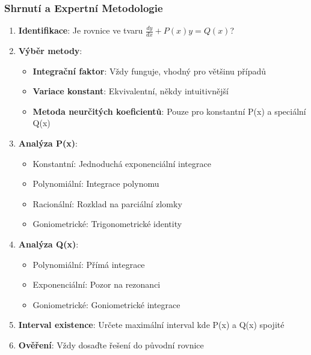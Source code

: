 \vspace{0.8\baselineskip}

\subsubsection{Shrnutí a Expertní Metodologie}
\label{subsubsec:shrnuti-metodologie}

\begin{method}
\label{met:decision-tree-linearni}
\begin{enumerate}
\item \textbf{Identifikace}: Je rovnice ve tvaru $\frac{dy}{dx} + P(x)y = Q(x)$?

\item \textbf{Výběr metody}:
\begin{itemize}
\item \textbf{Integrační faktor}: Vždy funguje, vhodný pro většinu případů
\item \textbf{Variace konstant}: Ekvivalentní, někdy intuitivnější
\item \textbf{Metoda neurčitých koeficientů}: Pouze pro konstantní P(x) a speciální Q(x)
\end{itemize}

\item \textbf{Analýza P(x)}:
\begin{itemize}
\item Konstantní: Jednoduchá exponenciální integrace
\item Polynomiální: Integrace polynomu
\item Racionální: Rozklad na parciální zlomky
\item Goniometrické: Trigonometrické identity
\end{itemize}

\item \textbf{Analýza Q(x)}:
\begin{itemize}
\item Polynomiální: Přímá integrace
\item Exponenciální: Pozor na rezonanci
\item Goniometrické: Goniometrické integrace
\end{itemize}

\item \textbf{Interval existence}: Určete maximální interval kde P(x) a Q(x) spojité

\item \textbf{Ověření}: Vždy dosaďte řešení do původní rovnice
\end{enumerate}
\end{method}

